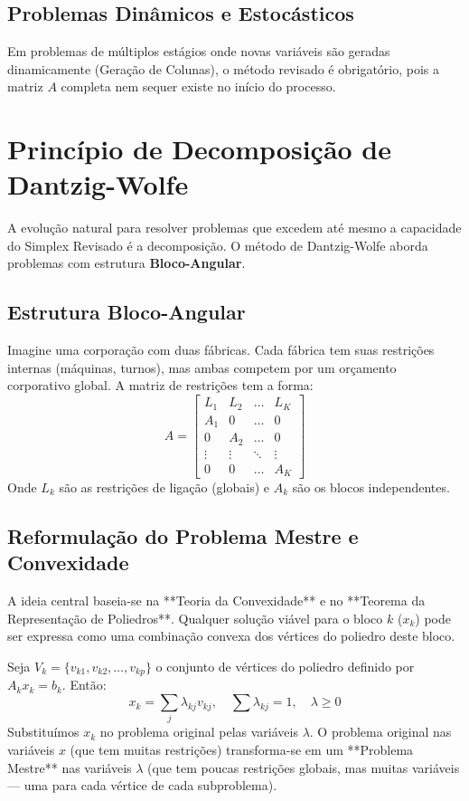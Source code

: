 \documentclass[12pt, a4paper]{article}
\begin{document}
\subsection{Problemas Dinâmicos e Estocásticos}
Em problemas de múltiplos estágios onde novas variáveis são geradas dinamicamente (Geração de Colunas), o método revisado é obrigatório, pois a matriz $A$ completa nem sequer existe no início do processo.

\section{Princípio de Decomposição de Dantzig-Wolfe}
A evolução natural para resolver problemas que excedem até mesmo a capacidade do Simplex Revisado é a decomposição. O método de Dantzig-Wolfe aborda problemas com estrutura \textbf{Bloco-Angular}.

\subsection{Estrutura Bloco-Angular}
Imagine uma corporação com duas fábricas. Cada fábrica tem suas restrições internas (máquinas, turnos), mas ambas competem por um orçamento corporativo global. A matriz de restrições tem a forma:
\begin{equation}
    A = \begin{bmatrix}
    L_1 & L_2 & \dots & L_K \\
    A_1 & 0 & \dots & 0 \\
    0 & A_2 & \dots & 0 \\
    \vdots & \vdots & \ddots & \vdots \\
    0 & 0 & \dots & A_K
    \end{bmatrix}
\end{equation}
Onde $L_k$ são as restrições de ligação (globais) e $A_k$ são os blocos independentes.

\subsection{Reformulação do Problema Mestre e Convexidade}
A ideia central baseia-se na **Teoria da Convexidade** e no **Teorema da Representação de Poliedros**. Qualquer solução viável para o bloco $k$ ($x_k$) pode ser expressa como uma combinação convexa dos vértices do poliedro deste bloco.

Seja $V_k = \{v_{k1}, v_{k2}, \dots, v_{kp}\}$ o conjunto de vértices do poliedro definido por $A_k x_k = b_k$. Então:
\begin{equation}
    x_k = \sum_{j} \lambda_{kj} v_{kj}, \quad \sum \lambda_{kj} = 1, \quad \lambda \ge 0
\end{equation}
Substituímos $x_k$ no problema original pelas variáveis $\lambda$. O problema original nas variáveis $x$ (que tem muitas restrições) transforma-se em um **Problema Mestre** nas variáveis $\lambda$ (que tem poucas restrições globais, mas muitas variáveis — uma para cada vértice de cada subproblema).
\end{document}
